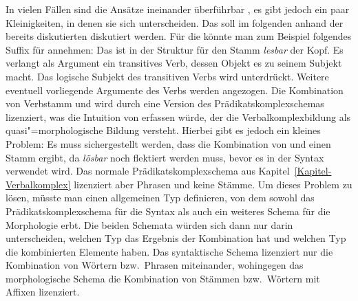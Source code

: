 In vielen Fällen sind die Ansätze ineinander überführbar \parencites[--169]{Koenig99a}[Kapitel~6.2.5.2]{Mueller2002b},
es gibt jedoch ein paar Kleinigkeiten, in denen sie sich unterscheiden. Das soll im folgenden
anhand der bereits diskutierten \bard diskutiert werden.
Für die \bard könnte man zum Beispiel folgendes Suffix für  annehmen:
\eas
{}%
\zs
Das \bars ist in der Struktur für den Stamm \emph{lesbar} der Kopf. Es verlangt als Argument ein transitives
Verb, dessen Objekt  es zu seinem Subjekt macht. Das logische Subjekt des transitiven Verbs wird unterdrückt.
Weitere eventuell vorliegende Argumente des Verbs  werden angezogen.
Die Kombination von Verbstamm und  wird durch eine Version des Prädikatskomplexschemas lizenziert,
was die Intuition von \citet{Bierwisch90a} erfassen würde, der die Verbalkomplexbildung als quasi"=morphologische
Bildung versteht. Hierbei gibt es jedoch ein kleines Problem: Es muss sichergestellt werden, dass die Kombination
von  und  einen Stamm ergibt, da \emph{lösbar} noch flektiert werden muss, bevor es in
der Syntax verwendet wird. Das normale Prädikatskomplexschema aus Kapitel~\ref{Kapitel-Verbalkomplex} lizenziert
aber Phrasen und keine Stämme. Um dieses Problem zu lösen, müsste man einen allgemeinen Typ definieren,
von dem sowohl das Prädikatskomplexschema für die Syntax als auch ein weiteres Schema für die Morphologie erbt.
Die beiden Schemata würden sich dann nur darin unterscheiden, welchen Typ das Ergebnis der Kombination hat und
welchen Typ die kombinierten Elemente haben. Das syntaktische Schema lizenziert nur die Kombination von Wörtern
bzw.\ Phrasen miteinander, wohingegen das morphologische Schema die Kombination von Stämmen bzw.\ Wörtern mit
Affixen lizenziert.

